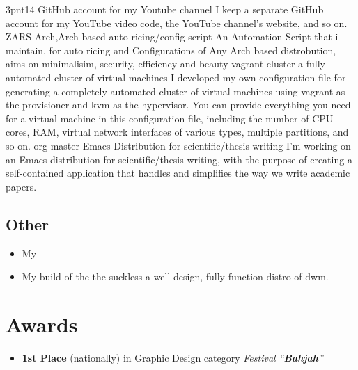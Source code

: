 \documentclass{cv}
\begin{document}
    {3pnt14 \href{https://github.com/3pnt14}{\gh}}
    {GitHub account for my Youtube channel}
    {I keep a separate GitHub account for my YouTube video code, the YouTube channel's website, and so on.}
    {ZARS \href{https://github.com/kebairia/zars}{\gh}}
    {Arch,Arch-based auto-ricing/config script}
    {An Automation Script that i maintain, for auto ricing and Configurations of Any Arch based distrobution, aims on minimalisim, security, efficiency and beauty}
    {vagrant-cluster \href{https://github.com/kebairia/vagrant-cluster}{\gh}}
    {a fully automated cluster of virtual machines}
    {I developed my own configuration file for generating a completely automated cluster of virtual machines using vagrant as the provisioner and kvm as the hypervisor. You can provide everything you need for a virtual machine in this configuration file, including the number of CPU cores, RAM, virtual network interfaces of various types, multiple partitions, and so on.}
    {org-master \href{https://github.com/kebairia/org-master}{\gh}}
    {Emacs Distribution for scientific/thesis writing}
    {I'm working on an Emacs distribution for scientific/thesis writing, with the purpose of creating a self-contained application that handles and simplifies the way we write academic papers.}

\subsection{Other}
\begin{itemize}
  \item My 
  \item My build of the the suckless  a well design, fully function distro of dwm.
\end{itemize}


\newpage
\section{Awards}
\begin{itemize}
  \item \award  \textbf{1st Place} (nationally) in  Graphic Design category \emph{Festival ``\textbf{Bahjah}''}
\end{itemize}
\end{document}
